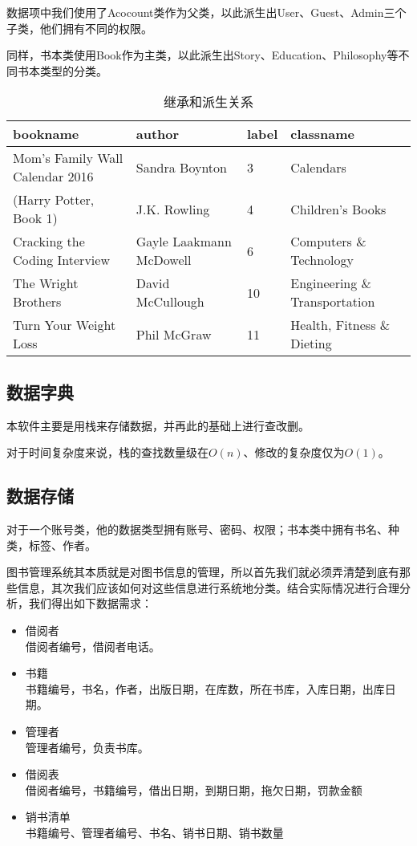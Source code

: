 \documentclass[forprint]{shmtu}
\begin{document}
数据项中我们使用了Acocount类作为父类，以此派生出User、Guest、Admin三个子类，他们拥有不同的权限。

同样，书本类使用Book作为主类，以此派生出Story、Education、Philosophy等不同书本类型的分类。

\begin{table}[!htbp]
	\caption{继承和派生关系}
	\begin{tabular}{llll}
		\hline
		bookname                        & author         & label & classname        \\ \hline
		Mom's Family Wall Calendar 2016 & Sandra Boynton & 3     & Calendars        \\
		(Harry Potter, Book 1)          & J.K. Rowling   & 4     & Children's Books \\
		Cracking the Coding Interview             & Gayle Laakmann McDowell & 6  & Computers \& Technology       \\
		The Wright Brothers                       & David McCullough        & 10 & Engineering \& Transportation \\
		Turn Your Weight Loss& Phil McGraw             & 11 & Health, Fitness \& Dieting    \\ \hline
	\end{tabular}
\end{table}

\subsection{数据字典}

本软件主要是用栈来存储数据，并再此的基础上进行查改删。

对于时间复杂度来说，栈的查找数量级在$O(n)$、修改的复杂度仅为$O(1)$。

\subsection{数据存储}

对于一个账号类，他的数据类型拥有账号、密码、权限；书本类中拥有书名、种类，标签、作者。

图书管理系统其本质就是对图书信息的管理，所以首先我们就必须弄清楚到底有那些信息，其次我们应该如何对这些信息进行系统地分类。结合实际情况进行合理分析，我们得出如下数据需求：

\begin{itemize}
	\item 借阅者\\借阅者编号，借阅者电话。
	\item 书籍\\书籍编号，书名，作者，出版日期，在库数，所在书库，入库日期，出库日期。
	\item 管理者\\管理者编号，负责书库。
	\item 借阅表\\借阅者编号，书籍编号，借出日期，到期日期，拖欠日期，罚款金额
	\item 销书清单\\书籍编号、管理者编号、书名、销书日期、销书数量
\end{itemize}
\end{document}
